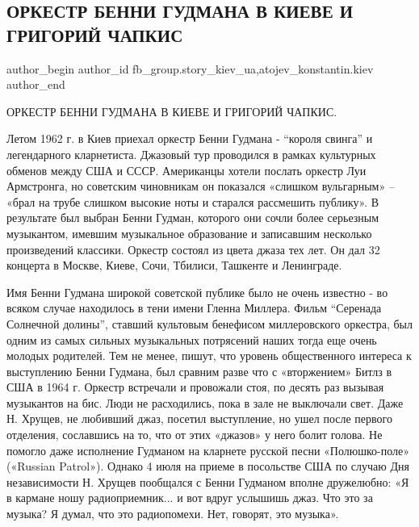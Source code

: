  
 
 
 
 
 
\subsection{ОРКЕСТР БЕННИ ГУДМАНА В КИЕВЕ И ГРИГОРИЙ ЧАПКИС}
\label{sec:26_12_2021.fb.fb_group.story_kiev_ua.3.orkestr_benni_gudman_grigorij_chapkis_1962}
 
\ifcmt
 author_begin
   author_id fb_group.story_kiev_ua,atojev_konstantin.kiev
 author_end
\fi

ОРКЕСТР БЕННИ ГУДМАНА В КИЕВЕ И ГРИГОРИЙ ЧАПКИС.

Летом 1962 г. в Киев приехал оркестр Бенни Гудмана - \enquote{короля свинга} и
легендарного кларнетиста. Джазовый тур проводился в рамках культурных обменов
между США и СССР. Американцы хотели послать оркестр Луи Армстронга, но
советским чиновникам он показался «слишком вульгарным» – «брал на трубе слишком
высокие ноты и старался рассмешить публику». В результате был выбран Бенни
Гудман, которого они сочли более серьезным музыкантом, имевшим музыкальное
образование и записавшим несколько произведений классики. Оркестр состоял из
цвета джаза тех лет. Он дал 32 концерта в Москве, Киеве, Сочи, Тбилиси,
Ташкенте и Ленинграде.


Имя Бенни Гудмана широкой советской публике было не очень известно - во всяком
случае находилось в тени имени Гленна Миллера. Фильм \enquote{Серенада Солнечной
долины}, ставший культовым бенефисом миллеровского оркестра, был одним из самых
сильных музыкальных потрясений наших тогда еще очень молодых родителей. Тем не
менее, пишут, что уровень общественного интереса к выступлению Бенни Гудмана,
был сравним разве что с «вторжением» Битлз в США в 1964 г. Оркестр встречали и
провожали стоя, по десять раз вызывая музыкантов на бис. Люди не расходились,
пока в зале не выключали свет. Даже Н. Хрущев, не любивший джаз, посетил
выступление, но ушел после первого отделения, сославшись на то, что от этих
«джазов» у него болит голова. Не помогло даже исполнение Гудманом на кларнете
русской песни «Полюшко-поле» («Russian Patrol»). Однако 4 июля на приеме в
посольстве США по случаю Дня независимости Н. Хрущев пообщался с Бенни Гудманом
вполне дружелюбно: «Я в кармане ношу радиоприемник... и вот вдруг услышишь
джаз. Что это за музыка? Я думал, что это радиопомехи. Нет, говорят, это
музыка». 


